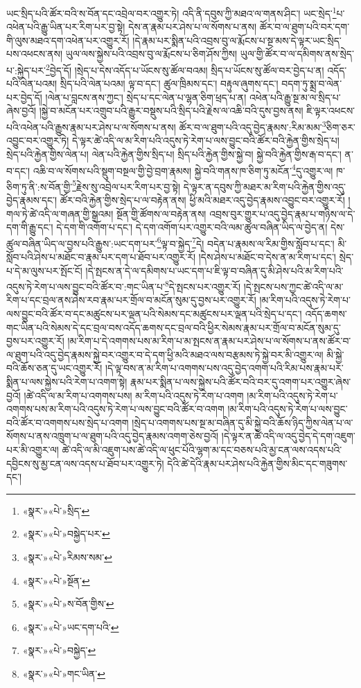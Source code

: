 ཡང་སྲིད་པའི་ཚོར་བའི་ས་བོན་དང་འབྲེལ་བར་འགྱུར་ཏེ། འདི་ནི་དབུས་ཀྱི་མཐའ་ལ་གནས་ཤིང་། ཡང་སྲེད་\footnote{«སྣར་»«པེ་»སྲིད་}པ་འཕེན་པའི་རྒྱུ་ཡིན་པར་རིག་པར་བྱ་སྟེ། དེས་ན་རྣམ་པར་ཤེས་པ་ལ་སོགས་པ་ནས། ཚོར་བ་ལ་ཐུག་པའི་བར་དག་གི་ལུས་མཐའ་དག་འཕེན་པར་འགྱུར་རོ། །དེ་རྣམ་པར་སྨིན་པའི་འབྲས་བུ་ལ་རྨོངས་པ་སྔ་མས་དེ་ལྟར་ཡང་སྲིད་པས་འཕངས་ནས། ཡུལ་ལས་སྐྱེས་པའི་འབྲས་བུ་ལ་རྨོངས་པ་ཅིག་ཤོས་ཀྱིས། ཡུལ་གྱི་ཚོར་བ་ལ་དམིགས་ནས་སྲེད་པ་:སྐྱེད་པར་\footnote{«སྣར་»«པེ་»བསྐྱེད་པར་}བྱེད་དོ། །སྲེད་པ་དེས་འདོད་པ་ཡོངས་སུ་ཚོལ་བའམ། སྲིད་པ་ཡོངས་སུ་ཚོལ་བར་བྱེད་པ་ན། འདོད་པའི་ལེན་པའམ། སྲིད་པའི་ལེན་པའམ། ལྟ་བ་དང་། ཚུལ་ཁྲིམས་དང་། བརྟུལ་ཞུགས་དང་། བདག་ཏུ་སྨྲ་བ་ལེན་པར་བྱེད་དོ། །ལེན་པ་བླངས་ནས་ཀྱང་། སྲེད་པ་དང་ལེན་པ་ལྷན་ཅིག་ཕྲད་པ་ན། འཕེན་པའི་རྒྱུ་སྔ་མ་ལ་སྲིད་པ་ཞེས་བྱའོ། །སྐྱེ་བ་མངོན་པར་འགྲུབ་པའི་རྒྱུར་བསྡུས་པའི་སྲིད་པའི་རྗེས་ལ་འཆི་བའི་དུས་བྱས་ནས། ཇི་ལྟར་འཕངས་པའི་འཕེན་པའི་རྒྱུས་རྣམ་པར་ཤེས་པ་ལ་སོགས་པ་ནས། ཚོར་བ་ལ་ཐུག་པའི་འདུ་བྱེད་རྣམས་:རིམ་མམ་\footnote{«སྣར་»«པེ་»རིམས་སམ་}ཅིག་ཅར་འབྱུང་བར་འགྱུར་ཏེ། དེ་ལྟར་ཚེ་འདི་ལ་མ་རིག་པའི་འདུས་ཏེ་རེག་པ་ལས་བྱུང་བའི་ཚོར་བའི་རྐྱེན་གྱིས་སྲེད་པ། སྲེད་པའི་རྐྱེན་གྱིས་ལེན་པ། ལེན་པའི་རྐྱེན་གྱིས་སྲིད་པ། སྲིད་པའི་རྐྱེན་གྱིས་སྐྱེ་བ། སྐྱེ་བའི་རྐྱེན་གྱིས་རྒ་བ་དང་། ན་བ་དང་། འཆི་བ་ལ་སོགས་པའི་སྡུག་བསྔལ་གྱི་བྱེ་བྲག་རྣམས། སྐྱེ་བའི་གནས་ཁ་ཅིག་ཏུ་མངོན་\footnote{«སྣར་»«པེ་»སྔོན་}དུ་འགྱུར་ལ། ཁ་ཅིག་ཏུ་ནི་:ས་བོན་གྱི་\footnote{«སྣར་»«པེ་»ས་བོན་གྱིས་}རྗེས་སུ་འབྲེལ་པར་རིག་པར་བྱ་སྟེ། དེ་ལྟར་ན་དབུས་ཀྱི་མཐར་མ་རིག་པའི་རྐྱེན་གྱིས་འདུ་བྱེད་རྣམས་དང་། ཚོར་བའི་རྐྱེན་གྱིས་སྲེད་པ་ལ་བརྟེན་ནས། ཕྱི་མའི་མཐར་འདུ་བྱེད་རྣམས་འབྱུང་བར་འགྱུར་རོ། །གལ་ཏེ་ཚེ་འདི་ལ་གཞན་གྱི་སྒྲའམ། སྔོན་གྱི་ཚོགས་ལ་བརྟེན་ནས། འབྲས་བུར་གྱུར་པ་འདུ་བྱེད་རྣམ་པ་གཉིས་ལ་དེ་དག་གི་རྒྱུ་དང་། དེ་དག་གི་འགོག་པ་དང་། དེ་དག་འགོག་པར་འགྱུར་བའི་ལམ་ཚུལ་བཞིན་ཡིད་ལ་བྱེད་ན། དེས་ཚུལ་བཞིན་ཡིད་ལ་བྱས་པའི་རྒྱུས་:ཡང་དག་པར་\footnote{«སྣར་»«པེ་»ཡང་དག་པའི་}ལྟ་བ་སྐྱེད་\footnote{«སྣར་»«པེ་»བསྐྱེད་}དེ། བདེན་པ་རྣམས་ལ་རིམ་གྱིས་སློབ་པ་དང་། མི་སློབ་པའི་ཤེས་པ་མཐོང་བ་རྣམ་པར་དག་པ་ཐོབ་པར་འགྱུར་རོ། །དེས་ཤེས་པ་མཐོང་བ་དེས་ན་མ་རིག་པ་དང་། སྲེད་པ་དེ་མ་ལུས་པར་སྤོང་ངོ། །དེ་སྤངས་ན་དེ་ལ་དམིགས་པ་ཡང་དག་པ་ཇི་ལྟ་བ་བཞིན་དུ་མི་ཤེས་པའི་མ་རིག་པའི་འདུས་ཏེ་རེག་པ་ལས་བྱུང་བའི་ཚོར་བ་:གང་ཡིན་པ་\footnote{«སྣར་»«པེ་»གང་ཡིན་}དེ་སྤངས་པར་འགྱུར་རོ། །དེ་སྤངས་པས་ཀྱང་ཚེ་འདི་ལ་མ་རིག་པ་དང་བྲལ་ནས་ཤེས་རབ་རྣམ་པར་གྲོལ་བ་མངོན་སུམ་དུ་བྱས་པར་འགྱུར་རོ། །མ་རིག་པའི་འདུས་ཏེ་རེག་པ་ལས་བྱུང་བའི་ཚོར་བ་དང་མཚུངས་པར་ལྡན་པའི་སེམས་དང་མཚུངས་པར་ལྡན་པའི་སྲེད་པ་དང་། འདོད་ཆགས་གང་ཡིན་པའི་སེམས་དེ་དང་བྲལ་བས་འདོད་ཆགས་དང་བྲལ་བའི་ཕྱིར་སེམས་རྣམ་པར་གྲོལ་བ་མངོན་སུམ་དུ་བྱས་པར་འགྱུར་རོ། །མ་རིག་པ་དེ་འགགས་པས་མ་རིག་པ་མ་སྤངས་ན་རྣམ་པར་ཤེས་པ་ལ་སོགས་པ་ནས་ཚོར་བ་ལ་ཐུག་པའི་འདུ་བྱེད་རྣམས་སྐྱེ་བར་འགྱུར་བ་དེ་དག་ཕྱི་མའི་མཐའ་ལས་བརྩམས་ཏེ་སྐྱེ་བར་མི་འགྱུར་ལ། མི་སྐྱེ་བའི་ཆོས་ཅན་དུ་ཡང་འགྱུར་རོ། །དེ་ལྟ་བས་ན་མ་རིག་པ་འགགས་པས་འདུ་བྱེད་འགག་པའི་རིམ་པས་རྣམ་པར་སྨིན་པ་ལས་སྐྱེས་པའི་རེག་པ་འགག་སྟེ། རྣམ་པར་སྨིན་པ་ལས་སྐྱེས་པའི་ཚོར་བའི་བར་དུ་འགག་པར་འགྱུར་ཞེས་བྱའོ། །ཚེ་འདི་ལ་མ་རིག་པ་འགགས་པས། མ་རིག་པའི་འདུས་ཏེ་རེག་པ་འགག །མ་རིག་པའི་འདུས་ཏེ་རེག་པ་འགགས་པས་མ་རིག་པའི་འདུས་ཏེ་རེག་པ་ལས་བྱུང་བའི་ཚོར་བ་འགག །མ་རིག་པའི་འདུས་ཏེ་རེག་པ་ལས་བྱུང་བའི་ཚོར་བ་འགགས་པས་སྲེད་པ་འགག །སྲེད་པ་འགགས་པས་སྔ་མ་བཞིན་དུ་མི་སྐྱེ་བའི་ཆོས་ཉིད་ཀྱིས་ལེན་པ་ལ་སོགས་པ་ནས་འཁྲུག་པ་ལ་ཐུག་པའི་འདུ་བྱེད་རྣམས་འགག་ཅེས་བྱའོ། །དེ་ལྟར་ན་ཚེ་འདི་ལ་འདུ་བྱེད་དེ་དག་འཇུག་པར་མི་འགྱུར་ལ། ཚེ་འདི་ལ་མི་འཇུག་པས་ཚེ་འདི་ལ་ཕུང་པོའི་ལྷག་མ་དང་བཅས་པའི་མྱ་ངན་ལས་འདས་པའི་དབྱིངས་སུ་མྱ་ངན་ལས་འདས་པ་ཐོབ་པར་འགྱུར་ཏེ། དེའི་ཚེ་དེའི་རྣམ་པར་ཤེས་པའི་རྐྱེན་གྱིས་མིང་དང་གཟུགས་དང་། 